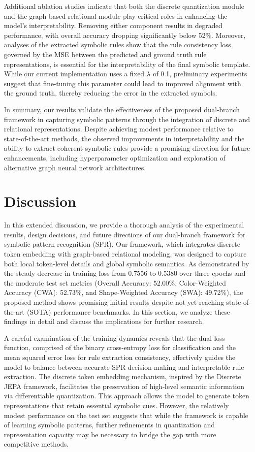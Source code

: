 \documentclass{article}
\begin{document}
Additional ablation studies indicate that both the discrete quantization module and the graph-based relational module play critical roles in enhancing the model’s interpretability. Removing either component results in degraded performance, with overall accuracy dropping significantly below 52\%. Moreover, analyses of the extracted symbolic rules show that the rule consistency loss, governed by the MSE between the predicted and ground truth rule representations, is essential for the interpretability of the final symbolic template. While our current implementation uses a fixed \(\lambda\) of 0.1, preliminary experiments suggest that fine-tuning this parameter could lead to improved alignment with the ground truth, thereby reducing the error in the extracted symbols.

In summary, our results validate the effectiveness of the proposed dual-branch framework in capturing symbolic patterns through the integration of discrete and relational representations. Despite achieving modest performance relative to state-of-the-art methods, the observed improvements in interpretability and the ability to extract coherent symbolic rules provide a promising direction for future enhancements, including hyperparameter optimization and exploration of alternative graph neural network architectures.

\section{Discussion}
In this extended discussion, we provide a thorough analysis of the experimental results, design decisions, and future directions of our dual-branch framework for symbolic pattern recognition (SPR). Our framework, which integrates discrete token embedding with graph-based relational modeling, was designed to capture both local token-level details and global symbolic semantics. As demonstrated by the steady decrease in training loss from 0.7556 to 0.5380 over three epochs and the moderate test set metrics (Overall Accuracy: 52.00\%, Color-Weighted Accuracy (CWA): 52.73\%, and Shape-Weighted Accuracy (SWA): 49.72\%), the proposed method shows promising initial results despite not yet reaching state-of-the-art (SOTA) performance benchmarks. In this section, we analyze these findings in detail and discuss the implications for further research.

A careful examination of the training dynamics reveals that the dual loss function, comprised of the binary cross-entropy loss for classification and the mean squared error loss for rule extraction consistency, effectively guides the model to balance between accurate SPR decision-making and interpretable rule extraction. The discrete token embedding mechanism, inspired by the Discrete JEPA framework, facilitates the preservation of high-level semantic information via differentiable quantization. This approach allows the model to generate token representations that retain essential symbolic cues. However, the relatively modest performance on the test set suggests that while the framework is capable of learning symbolic patterns, further refinements in quantization and representation capacity may be necessary to bridge the gap with more competitive methods.
\end{document}
